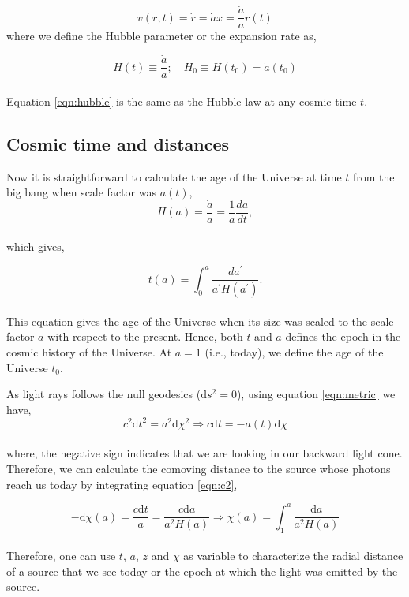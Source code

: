 \begin{equation}
	v(r,t) = \dot{r} = \dot{a} x = \dfrac{\dot{a}}{a} r(t)
	\label{eqn:hubble}
\end{equation}
where we define the Hubble parameter or the expansion rate as,

\begin{equation}
	H(t) \equiv \dfrac{\dot{a}}{a};\quad H_0 \equiv H(t_0) = \dot{a}(t_0)
\end{equation}
\\
Equation \ref{eqn:hubble} is the same as the Hubble law at any cosmic time $t$. 




\subsection{Cosmic time and distances}


Now it is straightforward to calculate the age of the Universe at time $t$ from the big bang
when scale factor was $a(t)$,
\begin{equation}
	H(a) = \dfrac{\dot{a}}{a} = \dfrac{1}{a} \dfrac{da}{dt},
\end{equation}
\\
which gives,

\begin{equation}
	t(a) = \int_0^a \dfrac{da^{\prime}}{a^{\prime}H(a^{\prime})}.
\end{equation}
\\
This equation gives the age of the Universe when its size was
scaled to the scale factor $a$ with respect to the present. Hence, both $t$ and
$a$ defines the epoch in the cosmic history of the Universe. At $a=1$ (i.e., today),
we define the age of the Universe $t_0$.

As light rays follows the null geodesics ($\mathrm{d}s^2=0$), using equation 
\ref{eqn:metric} we have,
\begin{equation}
	c^2\mathrm{d}t^2 = a^2\mathrm{d}\chi^2 \Rightarrow c\mathrm{d}t = -a(t)\mathrm{d}\chi
	\label{eqn:c2}
\end{equation}
\\
where, the negative sign indicates that we are looking in our backward light cone. 
Therefore, we can calculate the comoving distance to the source whose photons reach us
today by integrating equation \ref{eqn:c2},

\begin{equation}
	-\mathrm{d}\chi(a) = \dfrac{c\mathrm{d}t}{a} = 
	 \dfrac{c\mathrm{d}a}{a^2 H(a)}
	 \Rightarrow \chi(a) = \int_1^a \dfrac{\mathrm{d}a}{a^2H(a)}
\end{equation}
\\
Therefore, one can use $t$, $a$, $z$ and $\chi$ as variable to characterize the
radial distance of a source that we see today or the epoch at which the light was
emitted by the source. 

